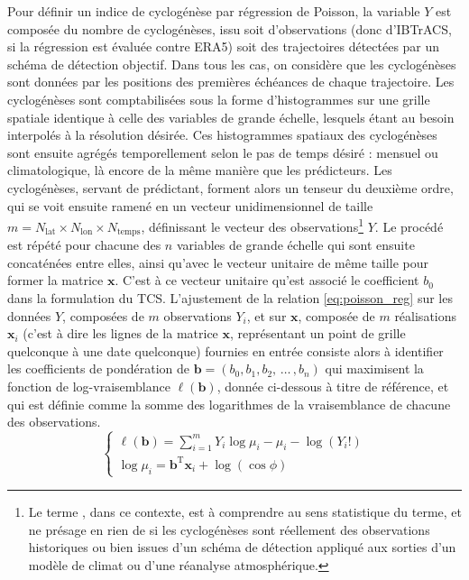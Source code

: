 \documentclass[../main.tex]{subfiles}
\begin{document}
Pour définir un indice de cyclogénèse par régression de Poisson, la variable $Y$ est composée du nombre de cyclogénèses, issu soit d'observations (donc
d'IBTrACS, si la régression est évaluée contre ERA5) soit des trajectoires détectées par un schéma de détection objectif. Dans tous les cas, on considère que
les cyclogénèses sont données par les positions des premières échéances de chaque trajectoire. Les cyclogénèses sont comptabilisées sous la forme d'histogrammes
sur une grille spatiale identique à celle des variables de grande échelle, lesquels étant au besoin interpolés à la résolution désirée. Ces histogrammes spatiaux des
cyclogénèses sont ensuite agrégés temporellement selon le pas de temps désiré : mensuel ou climatologique, là encore de la même manière que les prédicteurs.
Les cyclogénèses, servant de prédictant, forment alors un tenseur du deuxième ordre, qui se voit ensuite ramené en un vecteur unidimensionnel de taille $m =
N_{\mathrm{lat}} \times N_{\mathrm{lon}} \times N_{\mathrm{temps}}$, définissant le vecteur des observations\footnote{Le terme , dans ce
contexte, est à comprendre au sens statistique du terme, et ne présage en rien de si les cyclogénèses sont réellement des observations historiques ou bien
issues d'un schéma de détection appliqué aux sorties d'un modèle de climat ou d'une réanalyse atmosphérique.} $Y$. Le procédé est répété pour chacune des $n$
variables de grande échelle qui sont ensuite concaténées entre elles, ainsi qu'avec le vecteur unitaire de même taille pour former la matrice $\mathbf{x}$.
C'est à ce vecteur unitaire qu'est associé le coefficient $b_0$ dans la formulation du TCS. L'ajustement de la relation \ref{eq:poisson_reg} sur les données
$Y$, composées de $m$ observations $Y_i$, et sur $\mathbf{x}$, composée de $m$ réalisations $\mathbf{x}_i$ (c'est à dire les lignes de la matrice $\mathbf{x}$,
représentant un point de grille quelconque à une date quelconque) fournies en entrée consiste alors à identifier les coefficients de pondération de $\mathbf{b}
= (b_0, b_1, b_2, \, \ldots \, , b_n)$ qui maximisent la fonction de log-vraisemblance $\ell (\mathbf{b})$, donnée ci-dessous à titre de référence, et qui est
définie comme la somme des logarithmes de la vraisemblance de chacune des observations.
%
\begin{equation*}
    \begin{cases}
        \ell(\mathbf{b}) = \sum_{i = 1}^{m} Y_i \log \mu_i - \mu_i - \log(Y_i !) \\
        \log \mu_i = \mathbf{b}^{\mathrm{T}} \mathbf{x}_i + \log ( \cos \phi )
    \end{cases}
\end{equation*}
\end{document}
